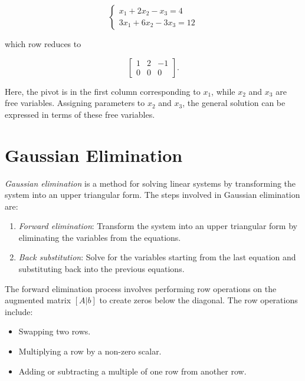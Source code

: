 \[
    \begin{cases}
        x_1 + 2x_2 - x_3 = 4 \\
        3x_1 + 6x_2 - 3x_3 = 12
    \end{cases}
\]

which row reduces to

\[
    \begin{bmatrix}
        1 & 2 & -1 \\
        0 & 0 & 0
    \end{bmatrix}.
\]

Here, the pivot is in the first column corresponding to \( x_1 \), while \( x_2 \) and \( x_3 \) are free variables. Assigning parameters to \( x_2 \) 
and \( x_3 \), the general solution can be expressed in terms of these free variables.

\section{Gaussian Elimination}

\emph{Gaussian elimination} is a method for solving linear systems by transforming the system into an upper
triangular form. The steps involved in Gaussian elimination are:

\begin{enumerate}

    \item \emph{Forward elimination}: Transform the system into an upper triangular form by eliminating the
          variables from the equations.

    \item \emph{Back substitution}: Solve for the variables starting from the last equation and substituting
          back into the previous equations.

\end{enumerate}

The forward elimination process involves performing row operations on the augmented matrix
\([A | b]\) to create zeros below the diagonal. The row operations include:

\begin{itemize}

    \item Swapping two rows.

    \item Multiplying a row by a non-zero scalar.

    \item Adding or subtracting a multiple of one row from another row.

\end{itemize}

